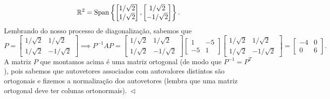 \documentclass[../livro.tex]{subfiles}
\begin{document}
\begin{example}
	\[
	\mathbb{R}^2 = \operatorname{Span} \left\lbrace 
	\begin{bmatrix}
	1/\sqrt{2} \\
	1/\sqrt{2}
	\end{bmatrix}, 
	\begin{bmatrix}
	1/\sqrt{2} \\
	-1/\sqrt{2}
	\end{bmatrix}
	\right\rbrace.
	\] Lembrando do nosso processo de diagonalização, sabemos que
	\[
	P =  
	\begin{bmatrix}
	1/\sqrt{2} &  1/\sqrt{2} \\
	1/\sqrt{2} & -1/\sqrt{2} 
	\end{bmatrix} \implies 
	P^{-1} A P = 
	\begin{bmatrix}
	1/\sqrt{2} &  1/\sqrt{2} \\
	1/\sqrt{2} & -1/\sqrt{2} 
	\end{bmatrix}
	\begin{bmatrix}
	1 & -5 \\
	-5 &  1
	\end{bmatrix}
	\begin{bmatrix}
	1/\sqrt{2} &  1/\sqrt{2} \\
	1/\sqrt{2} & -1/\sqrt{2} 
	\end{bmatrix} = 
	\begin{bmatrix}
	-4 & 0 \\
	0  & 6
	\end{bmatrix}.
	\] A matriz $P$ que montamos acima é uma matriz ortogonal (de modo que $P^{-1} = P^T$), pois sabemos que autovetores associados com autovalores distintos são ortogonais e fizemos a normalização dos autovetores (lembra que uma matriz ortogonal deve ter colunas ortonormais)$. \ \lhd$
\end{example}
\end{document}
